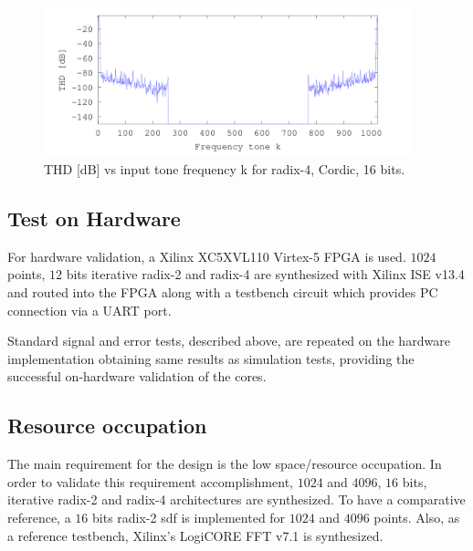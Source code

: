 \documentclass[conference]{IEEEtran}
\begin{document}
\begin{figure}[h!]
        \centering
        \includegraphics[width=10.7cm]{./figures/thd4_1.png}
        \caption{THD [dB] vs input tone frequency k for radix-4, Cordic, 16 bits.}
        \label{fig:r4_thd_1024_cor}
\end{figure}

\subsection{Test on Hardware}

For hardware validation, a Xilinx XC5XVL110 Virtex-5 FPGA is used. $1024$ points, $12$ bits iterative radix-2 and radix-4 are 
synthesized with Xilinx ISE v13.4 and routed into the FPGA along with a testbench circuit which provides PC connection via a UART port.

Standard signal and error tests, described above, are repeated on the hardware implementation obtaining same results as simulation tests, 
providing the successful on-hardware validation of the cores.

\subsection{Resource occupation}

The main requirement for the design is the low space/resource occupation. In order to validate this requirement accomplishment, $1024$ and $4096$, $16$ bits, iterative radix-2 and radix-4 architectures are 
synthesized. To have a comparative reference, a $16$ bits radix-2 sdf is implemented for $1024$ and $4096$ points.
Also, as a reference testbench, Xilinx's LogiCORE FFT v7.1 \cite{FFTXilinx} is synthesized.
\end{document}
